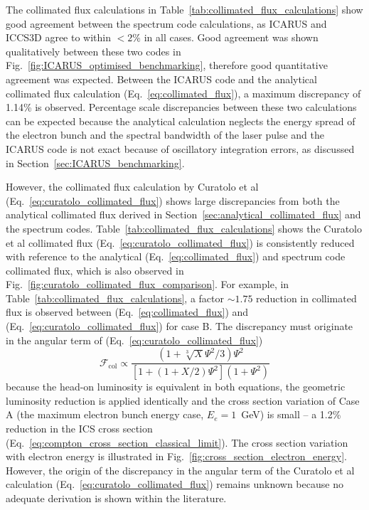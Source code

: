 \documentclass[../main.tex]{subfiles}
\begin{document}
The collimated flux calculations in Table~\ref{tab:collimated_flux_calculations} show good agreement between the spectrum code calculations, as \textsc{ICARUS} and \textsc{ICCS3D} agree to within $< 2\%$ in all cases. Good agreement was shown qualitatively between these two codes in Fig.~\ref{fig:ICARUS_optimised_benchmarking}, therefore good quantitative agreement was expected. Between the \textsc{ICARUS} code and the analytical collimated flux calculation (Eq.~\ref{eq:collimated_flux}), a maximum discrepancy of 1.14\% is observed. Percentage scale discrepancies between these two calculations can be expected because the analytical calculation neglects the energy spread of the electron bunch and the spectral bandwidth of the laser pulse and the \textsc{ICARUS} code is not exact because of oscillatory integration errors, as discussed in Section~\ref{sec:ICARUS_benchmarking}. 

However, the collimated flux calculation by Curatolo et al \cite{curatolo2017analytical} (Eq.~\ref{eq:curatolo_collimated_flux}) shows large discrepancies from both the analytical collimated flux derived in Section~\ref{sec:analytical_collimated_flux} and the spectrum codes. Table~\ref{tab:collimated_flux_calculations} shows the Curatolo et al collimated flux (Eq.~\ref{eq:curatolo_collimated_flux}) is consistently reduced with reference to the analytical (Eq.~\ref{eq:collimated_flux}) and spectrum code collimated flux, which is also observed in Fig.~\ref{fig:curatolo_collimated_flux_comparison}. For example, in Table~\ref{tab:collimated_flux_calculations}, a factor $\sim 1.75$ reduction in collimated flux is observed between (Eq.~\ref{eq:collimated_flux}) and (Eq.~\ref{eq:curatolo_collimated_flux}) for case B. The discrepancy must originate in the angular term of (Eq.~\ref{eq:curatolo_collimated_flux})
\begin{equation*}
\mathcal{F}_{\mathrm{col}}\propto\frac{\left(1+\sqrt[3]{X}\Psi^{2}/3\right)\Psi^{2}}{\left[1+\left(1+X/2\right)\Psi^{2}\right]\left(1+\Psi^{2}\right)}    
\end{equation*}
because the head-on luminosity is equivalent in both equations, the geometric luminosity reduction is applied identically and the cross section variation of Case A (the maximum electron bunch energy case, $E_{e}=1$~\si{\giga\electronvolt}) is small -- a 1.2\% reduction in the ICS cross section (Eq.~\ref{eq:compton_cross_section_classical_limit}). The cross section variation with electron energy is illustrated in Fig.~\ref{fig:cross_section_electron_energy}. However, the origin of the discrepancy in the angular term of the Curatolo et al \cite{curatolo2017analytical} calculation (Eq.~\ref{eq:curatolo_collimated_flux}) remains unknown because no adequate derivation is shown within the literature.   
\end{document}
